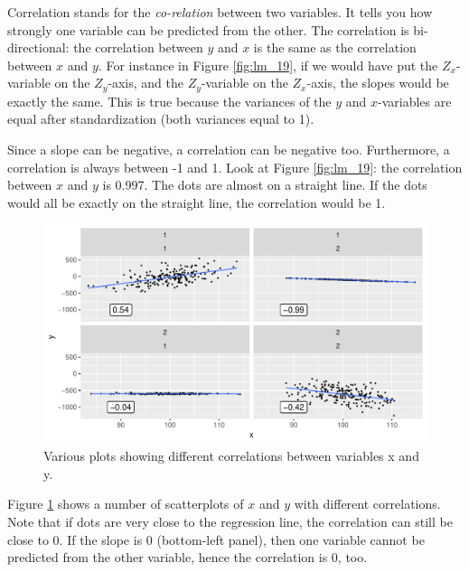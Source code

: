 \documentclass[]{book}\usepackage[]{graphicx}\usepackage[]{color}
\makeatletter
\def\maxwidth{ %
  \ifdim\Gin@nat@width>\linewidth
    \linewidth
  \else
    \Gin@nat@width
  \fi
}
\newenvironment{knitrout}{}{} %
\makeatother
\begin{document}
Correlation stands for the \textit{co-relation} between two variables. It tells you how strongly one variable can be predicted from the other. The correlation is bi-directional: the correlation between $y$ and $x$ is the same as the correlation between $x$ and $y$. For instance in Figure \ref{fig:lm_19}, if we would have put the $Z_x$-variable on the $Z_y$-axis, and the $Z_y$-variable on the $Z_x$-axis, the slopes would be exactly the same. This is true because the variances of the $y$ and $x$-variables are equal after standardization (both variances equal to 1).

Since a slope can be negative, a correlation can be negative too. Furthermore, a correlation is always between -1 and 1. Look at Figure \ref{fig:lm_19}: the correlation between $x$ and $y$ is 0.997. The dots are almost on a straight line. If the dots would all be exactly on the straight line, the correlation would be 1.

\begin{knitrout}
\color{fgcolor}\begin{figure}

{\centering \includegraphics[width=\maxwidth]{figure/lm_20-1} 

}

\caption[Various plots showing different correlations between variables x and y]{Various plots showing different correlations between variables x and y.}\label{fig:lm_20}
\end{figure}


\end{knitrout}


Figure \ref{fig:lm_20} shows a number of scatterplots of $x$ and $y$ with different correlations. Note that if dots are very close to the regression line, the correlation can still be close to 0. If the slope is 0 (bottom-left panel), then one variable cannot be predicted from the other variable, hence the correlation is 0, too.
\end{document}
